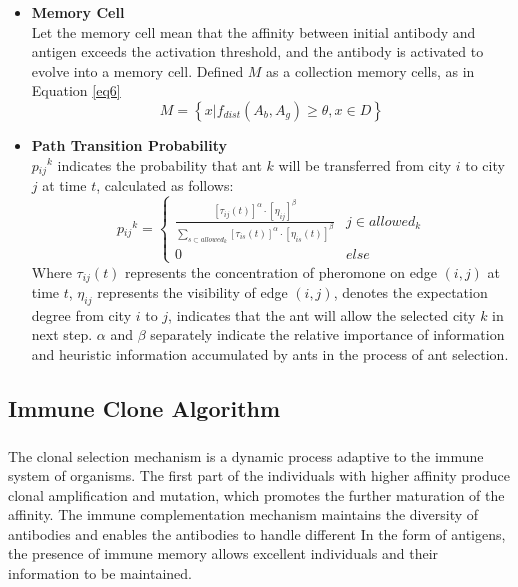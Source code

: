 \documentclass[11pt,a4paper,oldfontcommands]{memoir}
\newcommand{\upcite}[1]{\textsuperscript{\textsuperscript{\cite{#1}}}}
\begin{document}
\begin{itemize}
\item \textbf{Memory Cell}\\
Let the memory cell mean that the affinity between initial antibody and antigen exceeds the activation threshold, and the antibody is activated to evolve into a memory cell. Defined $M$ as a collection memory cells, as in Equation \ref {eq6}
\begin{equation}
M=\left \{ x |f_{dist} \left(A_{b},A_{g}\right)\geqslant \theta,x \in D \right \}
\tag{6} \label {eq6}
\end{equation}

\item \textbf{Path Transition Probability}\\
$p{_{ij}}^{k} $ indicates the probability that ant $k$ will be transferred from city $i$ to city $j$ at time $t$, calculated as follows:
\begin{equation}
p{_{ij}}^{k} =
\begin{cases}
\frac{[\tau_{ij}(t)]^\alpha \cdot [\eta_{ij}]^\beta} { \sum\limits_{s \subset allowed_{k}} [\tau_{is}(t)]^\alpha \cdot [\eta_{is}(t)]^\beta} & j \in allowed_k \\
0 & else
\end{cases}
\tag{7}
\end{equation}
Where $\tau_{ij}(t)$ represents the concentration of pheromone on edge $\left(i,j\right)$ at time $t$, $\eta_{ij}$ represents the visibility of edge $\left(i,j\right)$, denotes the expectation degree from city $i$ to $j$, indicates that the ant will allow the selected city $k$ in next step. $\alpha$ and $\beta$ separately indicate the relative importance of information and heuristic information accumulated by ants in the process of ant selection.
\end{itemize}

\subsection{Immune Clone Algorithm}
The clonal selection mechanism\upcite{Khilwani.2008} is a dynamic process adaptive to the immune system of organisms. The first part of the individuals with higher affinity produce clonal amplification and mutation, which promotes the further maturation of the affinity. The immune complementation mechanism maintains the diversity of antibodies and enables the antibodies to handle different In the form of antigens, the presence of immune memory allows excellent individuals and their information to be maintained.
\end{document}
